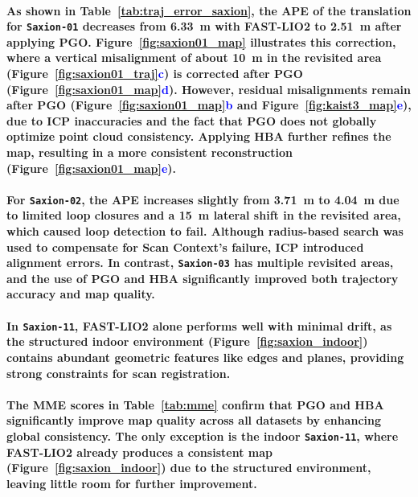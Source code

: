 \paragraph{\textnormal{
		As shown in Table~\ref{tab:traj_error_saxion}, the APE of the translation for \texttt{Saxion-01} decreases from 6.33~m with FAST-LIO2 to 2.51~m after applying PGO. Figure~\ref{fig:saxion01_map} illustrates this correction, where a vertical misalignment of about 10~m in the revisited area (Figure~\textcolor{blue}{\ref{fig:saxion01_traj}c}) is corrected after PGO (Figure~\textcolor{blue}{\ref{fig:saxion01_map}d}). However, residual misalignments remain after PGO (Figure~\textcolor{blue}{\ref{fig:saxion01_map}b} and Figure~\textcolor{blue}{\ref{fig:kaist3_map}e}), due to ICP inaccuracies and the fact that PGO does not globally optimize point cloud consistency. Applying HBA further refines the map, resulting in a more consistent reconstruction (Figure~\textcolor{blue}{\ref{fig:saxion01_map}e}).
}}

\paragraph{\textnormal{
		For \texttt{Saxion-02}, the APE increases slightly from 3.71~m to 4.04~m due to limited loop closures and a 15~m lateral shift in the revisited area, which caused loop detection to fail. Although radius-based search was used to compensate for Scan Context’s failure, ICP introduced alignment errors. In contrast, \texttt{Saxion-03} has multiple revisited areas, and the use of PGO and HBA significantly improved both trajectory accuracy and map quality.
}}

\paragraph{\textnormal{
		In \texttt{Saxion-11}, FAST-LIO2 alone performs well with minimal drift, as the structured indoor environment (Figure~\ref{fig:saxion_indoor}) contains abundant geometric features like edges and planes, providing strong constraints for scan registration.
}}

\paragraph{\textnormal{
		The MME scores in Table~\ref{tab:mme} confirm that PGO and HBA significantly improve map quality across all datasets by enhancing global consistency. The only exception is the indoor \texttt{Saxion-11}, where FAST-LIO2 already produces a consistent map (Figure~\ref{fig:saxion_indoor}) due to the structured environment, leaving little room for further improvement.
}}

